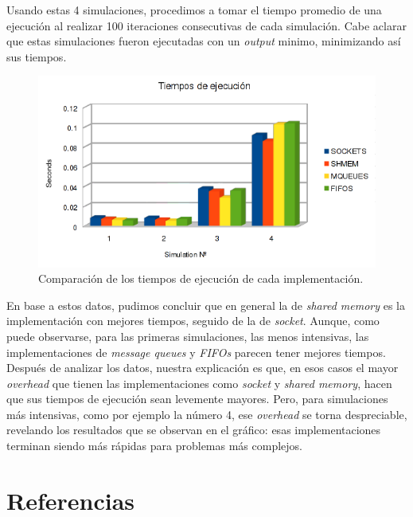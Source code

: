 \documentclass[a4paper,10pt]{article}
\begin{document}
Usando estas 4 simulaciones, procedimos a tomar el tiempo promedio de una ejecución al realizar 100 iteraciones consecutivas de cada simulación.
Cabe aclarar que estas simulaciones fueron ejecutadas con un \textit{output} minimo, minimizando así sus tiempos.

\begin{figure}[H]
\begin{center}
 \includegraphics[scale=0.75]{./images/runningTimesChart.png}
  \caption{Comparación de los tiempos de ejecución de cada implementación.}
\end{center}
\end{figure}

En base a estos datos, pudimos concluir que en general la de \textit{shared memory} es la implementación con mejores tiempos, seguido de la de \textit{socket}. 
Aunque, como puede observarse, para las primeras simulaciones, las menos intensivas, las implementaciones de \textit{message queues} y \textit{FIFOs} parecen 
tener mejores tiempos. Después de analizar los datos, nuestra explicación es que, en esos casos el mayor \textit{overhead} que tienen las implementaciones como 
\textit{socket} y \textit{shared memory}, hacen que sus tiempos de ejecución sean levemente mayores. 
Pero, para simulaciones más intensivas, como por ejemplo la número 4, ese \textit{overhead} se torna despreciable, revelando los resultados que se observan en 
el gráfico: esas implementaciones terminan siendo más rápidas para problemas más complejos.\\

\newpage     
\section{Referencias}
\end{document}
